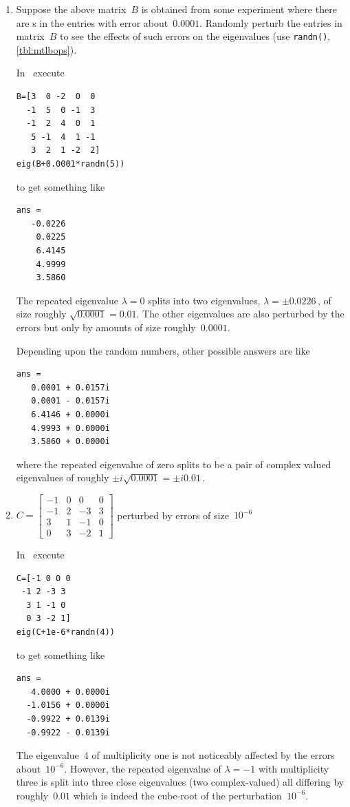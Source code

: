 \begin{example}
\begin{enumerate}
\item Suppose the above matrix~\(B\) is obtained from some experiment where there are s in the entries with error about~\(0.0001\).
Randomly perturb the entries in matrix~\(B\) to see the effects of such errors on the eigenvalues (use \verb|randn()|, \autoref{tbl:mtlbops}).
\begin{solution} 
In \script\ execute
\begin{verbatim}
B=[3  0 -2  0  0
  -1  5  0 -1  3
  -1  2  4  0  1
   5 -1  4  1 -1
   3  2  1 -2  2]
eig(B+0.0001*randn(5))
\end{verbatim}
\setbox\ajrqrbox\hbox{}%
\marginpar{\usebox{\ajrqrbox}}%
to get something like
\begin{verbatim}
ans =
   -0.0226
    0.0225
    6.4145
    4.9999
    3.5860
\end{verbatim}
The repeated eigenvalue \(\lambda=0\) splits into two eigenvalues, \(\lambda=\pm0.0226\)\,, of size roughly \(\sqrt{0.0001}=0.01\).
The other eigenvalues are also perturbed by the errors but only by amounts of size roughly~\(0.0001\).

Depending upon the random numbers, other possible answers are like
\begin{verbatim}
ans =
   0.0001 + 0.0157i
   0.0001 - 0.0157i
   6.4146 + 0.0000i
   4.9993 + 0.0000i
   3.5860 + 0.0000i
\end{verbatim}
where the repeated eigenvalue of zero splits to be a pair of complex valued eigenvalues of roughly \(\pm i\sqrt{0.0001}=\pm i0.01\)\,.
\end{solution}



\item \(C=\begin{bmatrix}-1&0&0&0
\\-1&2&-3&3
\\3&1&-1&0
\\0&3&-2&1\end{bmatrix}\) perturbed by errors of size~\(10^{-6}\)
\begin{solution} 
In \script\ execute
\begin{verbatim}
C=[-1 0 0 0
 -1 2 -3 3
  3 1 -1 0
  0 3 -2 1]
eig(C+1e-6*randn(4))
\end{verbatim}
\setbox\ajrqrbox\hbox{}%
\marginpar{\usebox{\ajrqrbox}}%
to get something like
\begin{verbatim}
ans =
   4.0000 + 0.0000i
  -1.0156 + 0.0000i
  -0.9922 + 0.0139i
  -0.9922 - 0.0139i
\end{verbatim}
The eigenvalue~\(4\) of multiplicity one is not noticeably affected by the errors about~\(10^{-6}\).
However, the repeated eigenvalue of \(\lambda=-1\) with multiplicity three is split into three close eigenvalues (two complex-valued) all differing by roughly~\(0.01\) which is indeed the cube-root of the perturbation~\(10^{-6}\).
\end{solution}


\end{enumerate}
\end{example}
